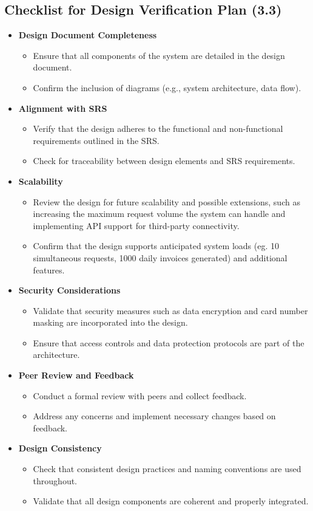 \documentclass[12pt, titlepage]{article}
\begin{document}
\subsection*{Checklist for Design Verification Plan (3.3)}
\begin{itemize}
    \item \textbf{Design Document Completeness}
    \begin{itemize}
        \item Ensure that all components of the system are detailed in the design document.
        \item Confirm the inclusion of diagrams (e.g., system architecture, data flow).
    \end{itemize}
    \item \textbf{Alignment with SRS}
    \begin{itemize}
        \item Verify that the design adheres to the functional and non-functional requirements outlined in the SRS.
        \item Check for traceability between design elements and SRS requirements.
    \end{itemize}
    \item \textbf{Scalability}
    \begin{itemize}
        \item Review the design for future scalability and possible extensions, such as increasing the maximum request volume the system can handle and implementing API support for third-party connectivity.
        \item Confirm that the design supports anticipated system loads (eg. 10 simultaneous requests, 1000 daily invoices generated) and additional features.
    \end{itemize}
    \item \textbf{Security Considerations}
    \begin{itemize}
        \item Validate that security measures such as data encryption and card number masking are incorporated into the design.
        \item Ensure that access controls and data protection protocols are part of the architecture.
    \end{itemize}
    \item \textbf{Peer Review and Feedback}
    \begin{itemize}
        \item Conduct a formal review with peers and collect feedback.
        \item Address any concerns and implement necessary changes based on feedback.
    \end{itemize}
    \item \textbf{Design Consistency}
    \begin{itemize}
        \item Check that consistent design practices and naming conventions are used throughout.
        \item Validate that all design components are coherent and properly integrated.
    \end{itemize}
\end{itemize}
\end{document}
